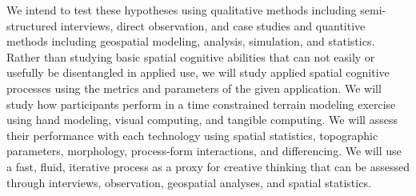 \documentclass{article}
\begin{document}

We intend to test these hypotheses using 
qualitative methods including semi-structured interviews, direct observation, and case studies
and 
quantitive methods including geospatial modeling, analysis, simulation, and statistics.
Rather than studying basic spatial cognitive abilities that can not easily or usefully be disentangled in applied use,
we will study applied spatial cognitive processes using the metrics and parameters of the given application.
We will study how participants perform in a time constrained terrain modeling exercise using hand modeling, visual computing, and tangible computing.
We will assess their performance with each technology using 
spatial statistics, topographic parameters, morphology, process-form interactions, and differencing.
We will use a fast, fluid, iterative process as a proxy for creative thinking that can be assessed through interviews, observation, geospatial analyses, and spatial statistics.

\clearpage





 
\end{document}

